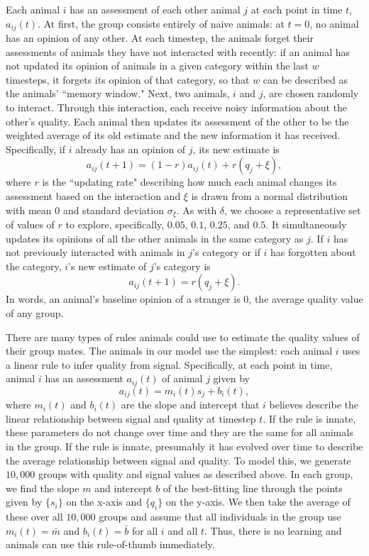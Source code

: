 Each animal $i$ has an assessment of each other animal $j$ at each point in time $t$, $a_{ij}(t)$.  At first, the group consists entirely of naive animals: at $t=0$, no animal has an opinion of any other. At each timestep, the animals forget their assessments of animals they have not interacted with recently: if an animal has not updated its opinion of animals in a given category within the last $w$ timesteps, it forgets its opinion of that category, so that $w$ can be described as the animals' ``memory window." Next, two animals, $i$ and $j$, are chosen randomly to interact. Through this interaction, each receive noisy information about the other's quality. Each animal then updates its assessment of the other to be the weighted average of its old estimate and the new information it has received. Specifically, if $i$ already has an opinion of $j$, its new estimate is
\begin{equation*}
a_{ij}(t+1)=(1-r)a_{ij}(t)+r(q_j+\xi),
\end{equation*}
where $r$ is the ``updating rate" describing how much each animal changes its assessment based on the interaction and $\xi$ is drawn from a normal distribution with mean $0$ and standard deviation $\sigma_\xi$. As with $\delta$, we choose a representative set of values of $r$ to explore, specifically, $0.05$, $0.1$, $0.25$, and $0.5$. It simultaneously updates its opinions of all the other animals in the same category as $j$.
If $i$ has not previously interacted with animals in $j$'s category or if $i$ has forgotten about the category, $i$'s new estimate of $j$'s category is
\begin{equation*}
a_{ij}(t+1)=r(q_j+\xi).
\end{equation*}
In words, an animal's baseline opinion of a stranger is $0$, the average quality value of any group. 

There are many types of rules animals could use to estimate the quality values of their group mates. The animals in our model use the simplest: each animal $i$ uses a linear rule to infer quality from signal. Specifically, at each point in time, animal $i$ has an assessment $a_{ij}(t)$ of animal $j$ given by 
\begin{equation*}
a_{ij}(t)=m_i(t)s_j+b_i(t),
\end{equation*}
where $m_i(t)$ and $b_i(t)$ are the slope and intercept that $i$ believes describe the linear relationship between signal and quality at timestep $t$. If the rule is innate, these parameters do not change over time and they are the same for all animals in the group. If the rule is innate, presumably it has evolved over time to describe the average relationship between signal and quality. To model this, we generate $10,000$ groups with quality and signal values as described above. In each group, we find the slope $m$ and intercept $b$ of the best-fitting line through the points given by $\{s_i\}$ on the x-axis and $\{q_i\}$ on the y-axis. We then take the average of these over all $10,000$ groups and assume that all individuals in the group use $m_i(t)=\bar{m}$ and $b_i(t)=\bar{b}$ for all $i$ and all $t$. Thus, there is no learning and animals can use this rule-of-thumb immediately. 


